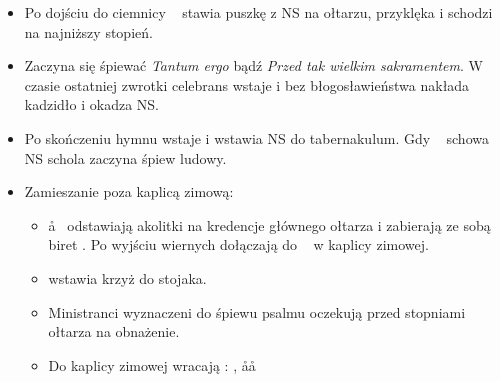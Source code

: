 \begin{itemize}
      \item Po dojściu do ciemnicy \ii~ stawia puszkę z NS na ołtarzu, przyklęka
            i schodzi na najniższy stopień.
      \item Zaczyna się śpiewać \textit{Tantum ergo} bądź \textit{Przed tak
                  wielkim sakramentem}. W czasie ostatniej zwrotki celebrans
            wstaje i bez błogosławieństwa nakłada kadzidło i okadza NS.
      \item Po skończeniu hymnu wstaje i wstawia NS do tabernakulum. Gdy \ii~
            schowa NS schola zaczyna śpiew ludowy.
      \item Zamieszanie poza kaplicą zimową:
            \begin{itemize}
                  \item \aa~ odstawiają akolitki na kredencje głównego
                        ołtarza i zabierają ze sobą biret \ii. Po wyjściu
                        wiernych dołączają do \ii~ w kaplicy zimowej.
                  \item {} wstawia krzyż do stojaka.
                  \item Ministranci wyznaczeni do śpiewu psalmu oczekują przed
                        stopniami ołtarza na obnażenie.
                  \item Do kaplicy zimowej wracają : , \aa\aa
            \end{itemize}
\end{itemize}
